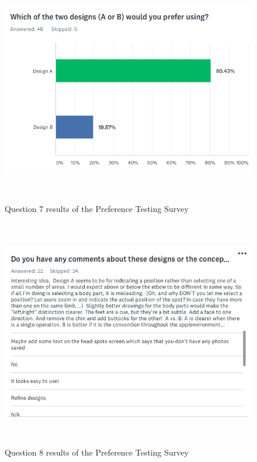\begin{figure}[H]
    \includegraphics[height=10cm, center]{figures/surveyresult7}
    \caption{Question 7 results of the Preference Testing Survey}
    \label{fig:surveyresult7}
\end{figure}
\begin{figure}[H]
    \includegraphics[height=10cm, center]{figures/surveyresult8}
    \caption{Question 8 results of the Preference Testing Survey}
    \label{fig:surveyresult8}
\end{figure}

